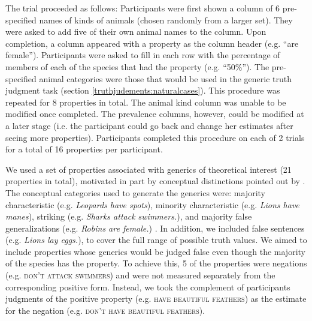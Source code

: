 \documentclass[10pt,letterpaper]{article}
\begin{document}
The trial proceeded as follows:
Participants were first shown a column of 6 pre-specified names of kinds of animals (chosen randomly from a larger set). 
They were asked to add five of their own animal names to the column. 
Upon completion, a column appeared with a property as the column header (e.g. ``are female'').
Participants were asked to fill in each row with the percentage of members of each of the species that had the property (e.g. ``50\%'').
The pre-specified animal categories were those that would be used in the generic truth judgment task (section \ref{truthjudements:naturalcases}).
This procedure was repeated for 8 properties in total. 
The animal kind column was unable to be modified once completed. 
The prevalence columns, however, could be modified at a later stage (i.e. the participant could go back and change her estimates after seeing more properties). 
Participants completed this procedure on each of 2 trials for a total of 16 properties per participant.


We used a set of properties associated with generics of theoretical interest (21 properties in total), motivated in part by conceptual distinctions pointed out by . 
The conceptual categories used to generate the generics were: majority characteristic (e.g. \emph{Leopards have spots}), minority characteristic (e.g. \emph{Lions have manes}), striking (e.g. \emph{Sharks attack swimmers.}), and majority false generalizations (e.g. \emph{Robins are female.}) \cite{Prasada2013}. 
In addition, we included false sentences (e.g. \emph{Lions lay eggs.}), to cover the full range of possible truth values.
We aimed to include properties whose generics would be judged false even though the majority of the species has the property. To achieve this, 5 of the properties were negations (e.g. \textsc{don't attack swimmers}) and were not measured separately from the corresponding positive form. 
Instead, we took the complement of participants judgments of the positive property (e.g. \textsc{have beautiful feathers}) as the estimate for the negation (e.g. \textsc{don't have beautiful feathers}).
\end{document}
